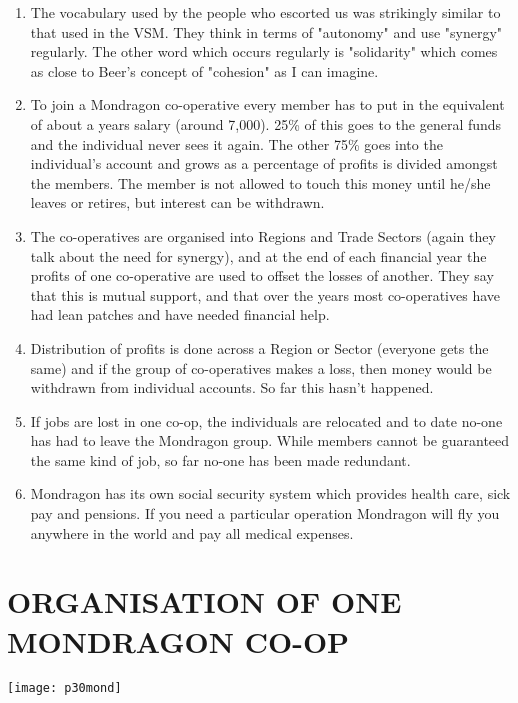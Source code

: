 \begin{enumerate}
  \item The vocabulary used by the people who escorted us was strikingly similar to that used in the VSM. They think in terms of "autonomy" and use "synergy" regularly. The other word which occurs regularly is "solidarity" which comes as close to Beer's concept of "cohesion" as I can imagine.

  \item To join a Mondragon co-operative every member has to put in the equivalent of about a years salary (around 7,000). 25\% of this goes to the general funds and the individual never sees it again. The other 75\% goes into the individual's account and grows as a percentage of profits is divided amongst the members. The member is not allowed to touch this money until he/she leaves or retires, but interest can be withdrawn.

  \item The co-operatives are organised into Regions and Trade Sectors (again they talk about the need for synergy), and at the end of each financial year the profits of one co-operative are used to offset the losses of another. They say that this is mutual support, and that over the years most co-operatives have had lean patches and have needed financial help.

  \item Distribution of profits is done across a Region or Sector (everyone gets the same) and if the group of co-operatives makes a loss, then money would be withdrawn from individual accounts. So far this hasn't happened.

  \item If jobs are lost in one co-op, the individuals are relocated and to date no-one has had to leave the Mondragon group. While members cannot be guaranteed the same kind of job, so far no-one has been made redundant.

  \item Mondragon has its own social security system which provides health care, sick pay and pensions. If you need a particular operation Mondragon will fly you anywhere in the world and pay all medical expenses.

\end{enumerate}

\section*{ORGANISATION OF ONE MONDRAGON CO-OP}
\begin{center}
\texttt{[image: p30mond]}
\end{center}


